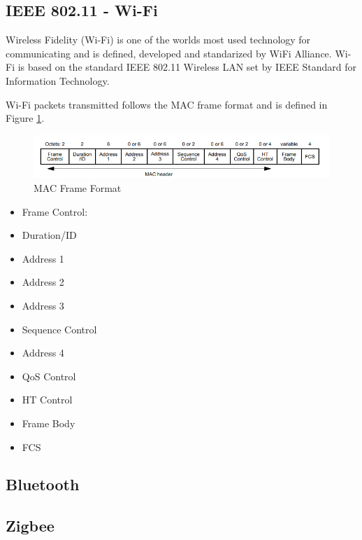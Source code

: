\subsection*{IEEE 802.11 - Wi-Fi}
Wireless Fidelity (Wi-Fi) \cite{WiFiAlliance} is one of the worlds most used technology for communicating and is defined, developed and standarized by WiFi Alliance. \cite{WiFiAlliance} Wi-Fi is based on the standard IEEE 802.11 Wireless LAN set by IEEE Standard for Information Technology. \cite{WifiStandard} 

Wi-Fi packets transmitted follows the MAC frame format and is defined in Figure \ref{MACFrameFormat}. \cite{WifiStandard} 
\begin{figure}
    \centering
    \includegraphics{figures/MACFrameFormat.png}
    \caption{MAC Frame Format \cite{WifiStandard}}
    \label{MACFrameFormat}
\end{figure}

\begin{itemize}
    \item Frame Control: 
    \item Duration/ID
    \item Address 1
    \item Address 2
    \item Address 3
    \item Sequence Control
    \item Address 4
    \item QoS Control
    \item HT Control
    \item Frame Body
    \item FCS
    
\end{itemize}

\subsection*{Bluetooth}

\subsection*{Zigbee}
